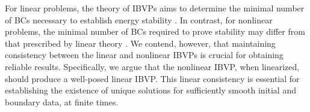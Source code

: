 \documentclass{article}
\numberwithin{equation}{section}
\theoremstyle{definition}
\begin{document}
For linear problems, the theory of IBVPs aims to determine the minimal number of BCs necessary to establish energy stability \cite{HEW2025113624,GHADER20141,gustafsson1995time,nordstrom2022linear}. In contrast, for nonlinear problems, the minimal number of BCs required to prove stability may differ from that prescribed by linear theory \cite{nordstrom2022nonlinear,nordstrom2024nonlinear}. We contend, however, that maintaining consistency between the linear and nonlinear IBVPs is crucial for obtaining reliable results. Specifically, we argue that the nonlinear IBVP, when linearized, should produce a well-posed linear IBVP. This linear consistency is essential for establishing the existence of unique solutions for sufficiently smooth initial and boundary data, at finite times.
\end{document}
